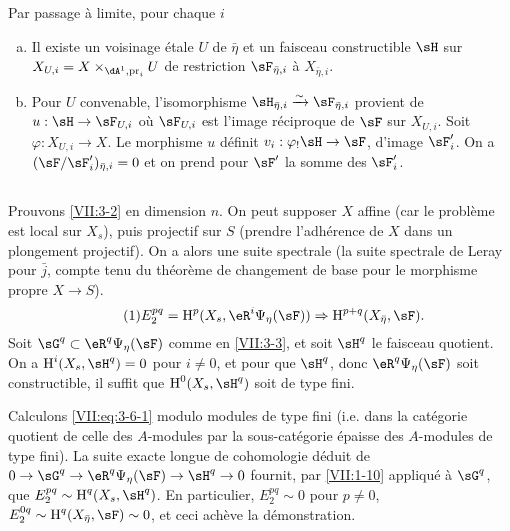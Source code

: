 Par passage à limite, pour chaque $i$
\begin{enumerate}[a)]
  \item Il existe un voisinage étale $U$ de $\bar\eta$ et un faisceau 
    constructible $\sH$ sur $X_{U,i} = X\times_{\dA^1,\pr_i} U$ de restriction 
    $\sF_{\bar\eta,i}$ à $X_{\bar\eta,i}$. 
  \item Pour $U$ convenable, l'isomorphisme 
    $\sH_{\bar\eta,i} \iso \sF_{\bar\eta,i}$ provient de $u:\sH\to \sF_{U,i}$ 
    où $\sF_{U,i}$ est l'image réciproque de $\sF$ sur $X_{U,i}$. Soit 
    $\varphi:X_{U,i} \to X$. Le morphisme $u$ définit 
    $v_i:\varphi_! \sH \to \sF$, d'image $\sF_i'$. On a 
    $(\sF/\sF_i')_{\bar\eta,i} = 0$ et on prend pour $\sF'$ la somme des 
    $\sF_i'$. 
\end{enumerate}





\subsection{}\label{VII:3-6}

Prouvons \ref{VII:3-2} en dimension $n$. On peut supposer $X$ affine (car le 
problème est local sur $X_s$), puis projectif sur $S$ (prendre l'adhérence 
de $X$ dans un plongement projectif). On a alors une suite spectrale 
\cite[I 2.2.3]{sga7} (la suite spectrale de Leray pour $\bar j$, compte tenu du 
théorème de changement de base pour le morphisme propre $X\to S$). 
\begin{equation*}\tag{1}\label{VII:eq:3-6-1}
  E_2^{p q} = \h^p(X_s,\eR^i\Psi_\eta(\sF)) \Rightarrow \h^{p+q}(X_{\bar\eta},\sF) \text{.} 
\end{equation*}
Soit $\sG^q\subset \eR^q \Psi_\eta(\sF)$ comme en \ref{VII:3-3}, et soit 
$\sH^q$ le faisceau quotient. On a $\h^i(X_s,\sH^q)=0$ pour $i\ne 0$, et pour 
que $\sH^q$, donc $\eR^q\Psi_\eta(\sF)$ soit constructible, il suffit que 
$\h^0(X_s,\sH^q)$ soit de type fini. 

Calculons \eqref{VII:eq:3-6-1} modulo modules de type fini (i.e. dans la 
catégorie quotient de celle des $A$-modules par la sous-catégorie épaisse 
des $A$-modules de type fini). La suite exacte longue de cohomologie déduit 
de $0 \to \sG^q \to \eR^q\Psi_\eta(\sF) \to \sH^q \to 0$ fournit, par 
\ref{VII:1-10} appliqué à $\sG^q$, que $E_2^{p q} \sim \h^q(X_s,\sH^q)$. 
En particulier, $E_2^{p q}\sim 0$ pour $p\ne 0$, 
$E_2^{0 q}\sim \h^q(X_{\bar\eta},\sF) \sim 0$, et ceci achève la 
démonstration. 

